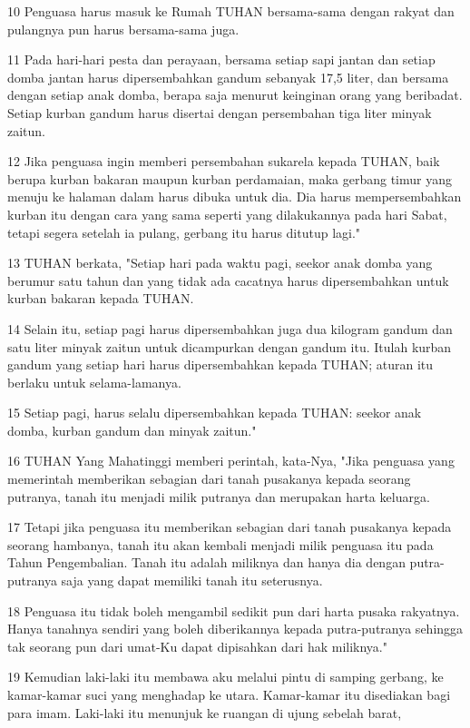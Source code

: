 \par 10 Penguasa harus masuk ke Rumah TUHAN bersama-sama dengan rakyat dan pulangnya pun harus bersama-sama juga.
\par 11 Pada hari-hari pesta dan perayaan, bersama setiap sapi jantan dan setiap domba jantan harus dipersembahkan gandum sebanyak 17,5 liter, dan bersama dengan setiap anak domba, berapa saja menurut keinginan orang yang beribadat. Setiap kurban gandum harus disertai dengan persembahan tiga liter minyak zaitun.
\par 12 Jika penguasa ingin memberi persembahan sukarela kepada TUHAN, baik berupa kurban bakaran maupun kurban perdamaian, maka gerbang timur yang menuju ke halaman dalam harus dibuka untuk dia. Dia harus mempersembahkan kurban itu dengan cara yang sama seperti yang dilakukannya pada hari Sabat, tetapi segera setelah ia pulang, gerbang itu harus ditutup lagi."
\par 13 TUHAN berkata, "Setiap hari pada waktu pagi, seekor anak domba yang berumur satu tahun dan yang tidak ada cacatnya harus dipersembahkan untuk kurban bakaran kepada TUHAN.
\par 14 Selain itu, setiap pagi harus dipersembahkan juga dua kilogram gandum dan satu liter minyak zaitun untuk dicampurkan dengan gandum itu. Itulah kurban gandum yang setiap hari harus dipersembahkan kepada TUHAN; aturan itu berlaku untuk selama-lamanya.
\par 15 Setiap pagi, harus selalu dipersembahkan kepada TUHAN: seekor anak domba, kurban gandum dan minyak zaitun."
\par 16 TUHAN Yang Mahatinggi memberi perintah, kata-Nya, "Jika penguasa yang memerintah memberikan sebagian dari tanah pusakanya kepada seorang putranya, tanah itu menjadi milik putranya dan merupakan harta keluarga.
\par 17 Tetapi jika penguasa itu memberikan sebagian dari tanah pusakanya kepada seorang hambanya, tanah itu akan kembali menjadi milik penguasa itu pada Tahun Pengembalian. Tanah itu adalah miliknya dan hanya dia dengan putra-putranya saja yang dapat memiliki tanah itu seterusnya.
\par 18 Penguasa itu tidak boleh mengambil sedikit pun dari harta pusaka rakyatnya. Hanya tanahnya sendiri yang boleh diberikannya kepada putra-putranya sehingga tak seorang pun dari umat-Ku dapat dipisahkan dari hak miliknya."
\par 19 Kemudian laki-laki itu membawa aku melalui pintu di samping gerbang, ke kamar-kamar suci yang menghadap ke utara. Kamar-kamar itu disediakan bagi para imam. Laki-laki itu menunjuk ke ruangan di ujung sebelah barat,

